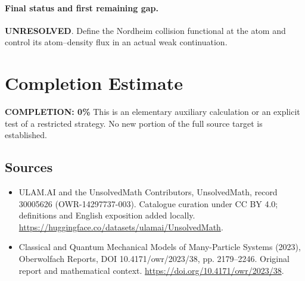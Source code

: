 \documentclass[11pt]{article}
\begin{document}
\paragraph{Final status and first remaining gap.}
\textbf{UNRESOLVED}. Define the Nordheim collision functional at the atom and control its atom--density flux in an actual weak continuation.

\section{Completion Estimate}
\noindent\textbf{COMPLETION: 0\%}
This is an elementary auxiliary calculation or an explicit test of a restricted strategy. No new portion of the full source target is established.

\subsection{Sources}
\begin{itemize}
\item[\hypertarget{source:30005626:1}{S1}] ULAM.AI and the UnsolvedMath Contributors, UnsolvedMath, record 30005626 (OWR-14297737-003). Catalogue curation under CC BY 4.0; definitions and English exposition added locally.
\url{https://huggingface.co/datasets/ulamai/UnsolvedMath}.
\item[\hypertarget{source:30005626:2}{S2}] Classical and Quantum Mechanical Models of Many-Particle Systems (2023), Oberwolfach Reports, DOI 10.4171/owr/2023/38, pp. 2179--2246. Original report and mathematical context.
\url{https://doi.org/10.4171/owr/2023/38}.
\end{itemize}
\label{end:30005626}
\end{document}
